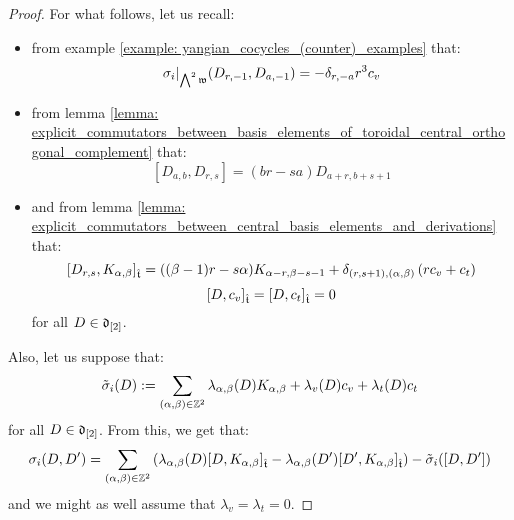 \begin{proof}
                For what follows, let us recall:
                \begin{itemize}
                    \item from example \ref{example: yangian_cocycles_(counter)_examples} that:
                        $$\sigma_i|_{ \bigwedge^2 \mathfrak{w} }(D_{r, -1}, D_{a, -1}) = -\delta_{r, -a} r^3 c_v$$
                    \item from lemma \ref{lemma: explicit_commutators_between_basis_elements_of_toroidal_central_orthogonal_complement} that:
                        $$[D_{a, b}, D_{r, s}] = (br - sa) D_{a + r, b + s + 1}$$
                    \item and from lemma \ref{lemma: explicit_commutators_between_central_basis_elements_and_derivations} that:
                        $$[D_{r, s}, K_{\alpha, \beta}]_{\hat{\mathfrak{t}}} = ((\beta - 1)r - s\alpha) K_{\alpha - r, \beta - s - 1} + \delta_{(r, s + 1), (\alpha, \beta)} \left( r c_v + c_t \right)$$
                        $$[D, c_v]_{\hat{\mathfrak{t}}} = [D, c_t]_{\hat{\mathfrak{t}}} = 0$$
                    for all $D \in \mathfrak{d}_{[2]}$.
                \end{itemize}
                Also, let us suppose that:
                    $$\tilde{\sigma}_i(D) := \sum_{(\alpha, \beta) \in \mathbb{Z}^2} \lambda_{\alpha, \beta}(D) K_{\alpha, \beta} + \lambda_v(D) c_v + \lambda_t(D) c_t$$
                for all $D \in \mathfrak{d}_{[2]}$. From this, we get that:
                    $$\sigma_i(D, D') = \sum_{(\alpha, \beta) \in \mathbb{Z}^2} \left( \lambda_{\alpha, \beta}(D) [D, K_{\alpha, \beta}]_{\hat{\mathfrak{t}}} - \lambda_{\alpha, \beta}(D') [D', K_{\alpha, \beta}]_{\hat{\mathfrak{t}}} \right) - \tilde{\sigma}_i( [D, D'] )$$
                and we might as well assume that $\lambda_v = \lambda_t = 0$.


\end{proof}
